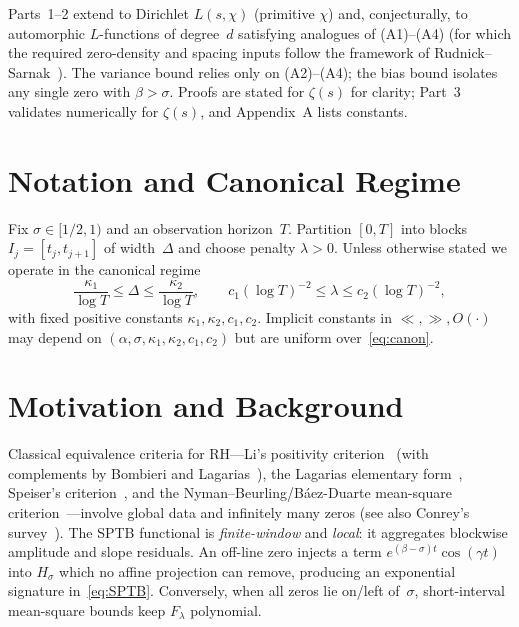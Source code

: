\begin{remark}
Parts~1–2 extend to Dirichlet $L(s,\chi)$ (primitive $\chi$) and, conjecturally, to
automorphic $L$-functions of degree~$d$ satisfying analogues of (A1)–(A4)
(for which the required zero-density and spacing inputs follow the framework
of Rudnick--Sarnak~\cite{rudnick-sarnak}).
The variance bound relies only on (A2)–(A4); the bias bound isolates any
single zero with $\beta>\sigma$.  Proofs are stated for $\zeta(s)$ for clarity;
Part~3 validates numerically for $\zeta(s)$, and Appendix~A lists constants.
\end{remark}

\section{Notation and Canonical Regime}

Fix $\sigma\in[1/2,1)$ and an observation horizon~$T$.
Partition $[0,T]$ into blocks $I_j=[t_j,t_{j+1}]$ of width~$\Delta$ and choose
penalty $\lambda>0$.  Unless otherwise stated we operate in the canonical regime
\begin{equation}
\frac{\kappa_1}{\log T}\le\Delta\le\frac{\kappa_2}{\log T},
\qquad
c_1(\log T)^{-2}\le\lambda\le c_2(\log T)^{-2},
\label{eq:canon}
\tag{1.2}
\end{equation}
with fixed positive constants $\kappa_1,\kappa_2,c_1,c_2$.
Implicit constants in $\ll,\gg,O(\cdot)$ may depend on
$(\alpha,\sigma,\kappa_1,\kappa_2,c_1,c_2)$ but are uniform over~\eqref{eq:canon}.

\section{Motivation and Background}

Classical equivalence criteria for RH—Li's positivity criterion~\cite{li-criterion}
(with complements by Bombieri and Lagarias~\cite{bombieri-lagarias}), the Lagarias
elementary form~\cite{lagarias}, Speiser's criterion~\cite{speiser}, and the
Nyman--Beurling/B\'aez-Duarte mean-square criterion~\cite{beurling,baezduarte}—involve
global data and infinitely many zeros (see also Conrey's survey~\cite{conrey-notices}).  The SPTB functional is
\emph{finite-window} and \emph{local}: it aggregates blockwise amplitude and slope
residuals.  An off-line zero injects a term
$e^{(\beta-\sigma)t}\cos(\gamma t)$ into $H_\sigma$ which no affine projection can remove,
producing an exponential signature in~\eqref{eq:SPTB}.
Conversely, when all zeros lie on/left of~$\sigma$, short-interval
mean-square bounds keep $F_\lambda$ polynomial.

